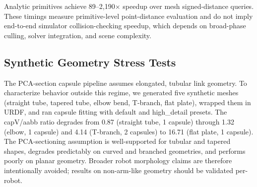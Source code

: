 Analytic primitives achieve 89--2,190$\times$ speedup over mesh signed-distance queries. These timings measure primitive-level point-distance evaluation and do not imply end-to-end simulator collision-checking speedup, which depends on broad-phase culling, solver integration, and scene complexity.

\subsection{Synthetic Geometry Stress Tests}

The PCA-section capsule pipeline assumes elongated, tubular link geometry. To characterize behavior outside this regime, we generated five synthetic meshes (straight tube, tapered tube, elbow bend, T-branch, flat plate), wrapped them in URDF, and ran capsule fitting with default and high\_detail presets. The capV/aabb ratio degrades from 0.87 (straight tube, 1 capsule) through 1.32 (elbow, 1 capsule) and 4.14 (T-branch, 2 capsules) to 16.71 (flat plate, 1 capsule). The PCA-sectioning assumption is well-supported for tubular and tapered shapes, degrades predictably on curved and branched geometries, and performs poorly on planar geometry. Broader robot morphology claims are therefore intentionally avoided; results on non-arm-like geometry should be validated per-robot.
